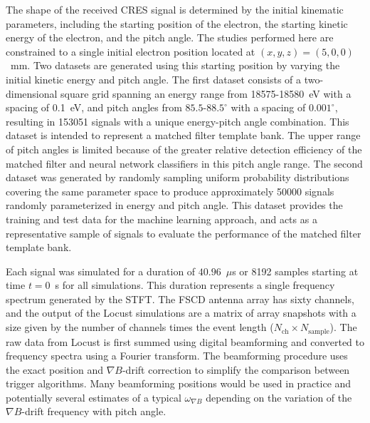 The shape of the received CRES signal is determined by the initial kinematic parameters, including the starting position of the electron, the starting kinetic energy of the electron, and the pitch angle. The studies performed here are constrained to a single initial electron position located at $(x,y,z)=(5, 0, 0)$~mm. Two datasets are generated using this starting position by varying the initial kinetic energy and pitch angle. The first dataset consists of a two-dimensional square grid spanning an energy range from 18575-18580~eV with a spacing of 0.1~eV, and pitch angles from $85.5$-$88.5^\circ$ with a spacing of $0.001^\circ$, resulting in 153051 signals with a unique energy-pitch angle combination. This dataset is intended to represent a matched filter template bank. The upper range of pitch angles is limited because of the greater relative detection efficiency of the matched filter and neural network classifiers in this pitch angle range. The second dataset was generated by randomly sampling uniform probability distributions covering the same parameter space to produce approximately 50000 signals randomly parameterized in energy and pitch angle. This dataset provides the training and test data for the machine learning approach, and acts as a representative sample of signals to evaluate the performance of the matched filter template bank.

Each signal was simulated for a duration of $40.96$~$\mu$s or 8192 samples starting at time $t=0$~s for all simulations. This duration represents a single frequency spectrum generated by the STFT. The FSCD antenna array has sixty channels, and the output of the Locust simulations are a matrix of array snapshots with a size given by the number of channels times the event length ($N_\textrm{ch}\times N_\textrm{sample}$). The raw data from Locust is first summed using digital beamforming and converted to frequency spectra using a Fourier transform. The beamforming procedure uses the exact position and $\nabla B$-drift correction to simplify the comparison between trigger algorithms. Many beamforming positions would be used in practice and potentially several estimates of a typical $\omega_{\nabla B}$ depending on the variation of the $\nabla B$-drift frequency with pitch angle.

